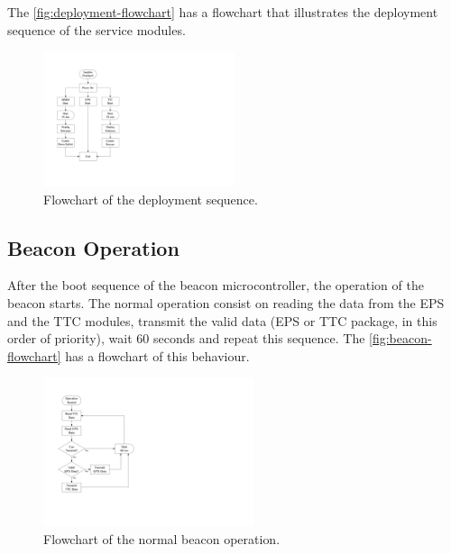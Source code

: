 The \autoref{fig:deployment-flowchart} has a flowchart that illustrates the deployment sequence of the service modules.

\begin{figure}[!ht]
    \begin{center}
        \includegraphics[width=0.5\textwidth]{figures/deployment-flowchart.pdf}
        \caption{Flowchart of the deployment sequence.}
        \label{fig:deployment-flowchart}
    \end{center}
\end{figure}

\subsection{Beacon Operation}

After the boot sequence of the beacon microcontroller, the operation of the beacon starts. The normal operation consist on reading the data from the EPS and the TTC modules, transmit the valid data (EPS or TTC package, in this order of priority), wait 60 seconds and repeat this sequence. The \autoref{fig:beacon-flowchart} has a flowchart of this behaviour.

\begin{figure}[!ht]
    \begin{center}
        \includegraphics[width=0.55\textwidth]{figures/beacon-flowchart.pdf}
        \caption{Flowchart of the normal beacon operation.}
        \label{fig:beacon-flowchart}
    \end{center}
\end{figure}

